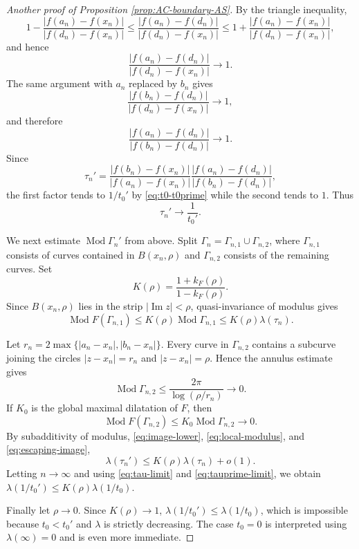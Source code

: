 \documentclass[11pt]{amsart}
\numberwithin{equation}{section}
\theoremstyle{definition} %
\theoremstyle{remarkstyle}
\newcommand{\Mod}{\operatorname{Mod}}
\begin{document}
\begin{proof}[Another proof of Proposition \ref{prop:AC-boundary-AS}]
By the triangle inequality,
\[
1-\frac{|f(a_n)-f(x_n)|}{|f(d_n)-f(x_n)|}\leq\frac{|f(a_n)-f(d_n)|}{|f(d_n)-f(x_n)|}\leq1+\frac{|f(a_n)-f(x_n)|}{|f(d_n)-f(x_n)|},
\]
and hence
\[
\frac{|f(a_n)-f(d_n)|}{|f(d_n)-f(x_n)|}\to 1.
\]
The same argument with $a_n$ replaced by $b_n$ gives
\[
\frac{|f(b_n)-f(d_n)|}{|f(d_n)-f(x_n)|}\to 1,
\]
and therefore
\[
\frac{|f(a_n)-f(d_n)|}{|f(b_n)-f(d_n)|}\to 1.
\]
Since
\[
\tau_n'=\frac{|f(b_n)-f(x_n)|}{|f(a_n)-f(x_n)|}\frac{|f(a_n)-f(d_n)|}{|f(b_n)-f(d_n)|},
\]
the first factor tends to $1/t_0'$ by \eqref{eq:t0-t0prime} while the second tends to $1$. 
Thus
\begin{equation}\label{eq:tauprime-limit}
\tau_n'\to \frac1{t_0'}.
\end{equation}


We next estimate $\Mod\Gamma_n'$ from above.  
Split $\Gamma_n=\Gamma_{n,1}\cup\Gamma_{n,2}$, where $\Gamma_{n,1}$ consists of curves contained in $B(x_n,\rho)$ and $\Gamma_{n,2}$ consists of the remaining curves.  
Set
\[
 K(\rho)=\frac{1+k_F(\rho)}{1-k_F(\rho)}.
\]
Since $B(x_n,\rho)$ lies in the strip $|\operatorname{Im}z|<\rho$, quasi-invariance of modulus gives
\begin{equation}\label{eq:local-modulus}
 \Mod F(\Gamma_{n,1})\leq K(\rho)\Mod\Gamma_{n,1}\leq K(\rho)\lambda(\tau_n).
\end{equation}

Let $r_n=2\max\{|a_n-x_n|,|b_n-x_n|\}$.
Every curve in $\Gamma_{n,2}$ contains a subcurve joining the circles $|z-x_n|=r_n$ and $|z-x_n|=\rho$.  
Hence the annulus estimate gives
\begin{equation}\label{eq:escaping-modulus}
 \Mod\Gamma_{n,2}\leq\frac{2\pi}{\log(\rho/r_n)}\to 0.
\end{equation}
If $K_0$ is the global maximal dilatation of $F$, then
\begin{equation}\label{eq:escaping-image}
 \Mod F(\Gamma_{n,2})\leq K_0\Mod\Gamma_{n,2}\to 0.
\end{equation}
By subadditivity of modulus, \eqref{eq:image-lower}, \eqref{eq:local-modulus}, and \eqref{eq:escaping-image},
\[
 \lambda(\tau_n')\leq K(\rho)\lambda(\tau_n)+o(1).
\]
Letting $n\to\infty$ and using \eqref{eq:tau-limit} and \eqref{eq:tauprime-limit}, we obtain $\lambda(1/t_0')\leq K(\rho)\lambda(1/t_0)$.

Finally let $\rho\to0$.  Since $K(\rho)\to1$, $\lambda(1/t_0')\le\lambda(1/t_0)$, which is impossible because $t_0<t_0'$ and $\lambda$ is strictly decreasing.
The case $t_0=0$ is interpreted using $\lambda(\infty)=0$ and is even more immediate.
\end{proof}
\end{document}
